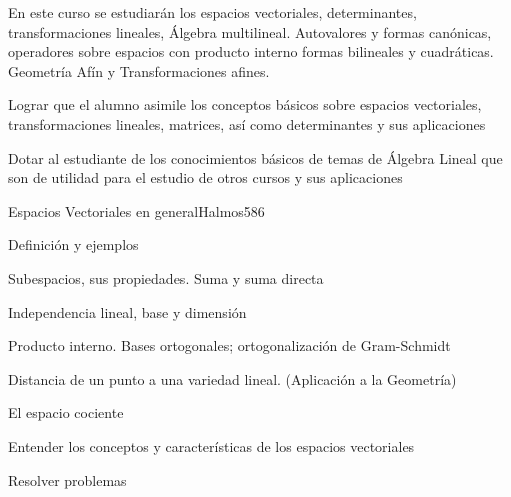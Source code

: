 \begin{syllabus}


\begin{justification}
En este curso se estudiarán los espacios vectoriales, determinantes, transformaciones lineales, Álgebra multilineal.
Autovalores y formas canónicas, operadores sobre espacios con producto interno formas bilineales y cuadráticas. Geometría Afín y Transformaciones afines.
\end{justification}

\begin{goals}
\item  Lograr que el alumno asimile los conceptos básicos sobre espacios vectoriales, transformaciones lineales, matrices, así como determinantes y sus aplicaciones
\item  Dotar al estudiante de los conocimientos básicos de temas de Álgebra Lineal que son de utilidad para el estudio de otros cursos y sus aplicaciones
\end{goals}

\begin{outcomes}
\end{outcomes}

\begin{unit}{Espacios Vectoriales en general}{Halmos58}{6}
   \begin{topics}
         \item  Definición y ejemplos
	 \item  Subespacios, sus propiedades. Suma y suma directa
         \item  Independencia lineal, base y dimensión
	 \item  Producto interno. Bases ortogonales; ortogonalización de Gram-Schmidt
         \item  Distancia de un punto a una variedad lineal. (Aplicación a la Geometría)
         \item  El espacio cociente
   \end{topics}

   \begin{unitgoals}
         \item  Entender los conceptos y características de los espacios vectoriales
         \item  Resolver problemas
   \end{unitgoals}
\end{unit}


\end{syllabus}
